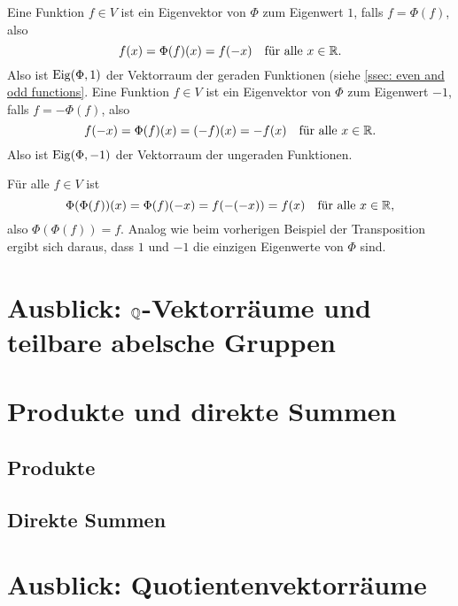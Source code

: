 \begin{bsp}
\begin{enumerate}
   Eine Funktion $f \in V$ ist ein Eigenvektor von $\Phi$ zum Eigenwert $1$, falls $f = \Phi(f)$, also
   \[
    f(x) = \Phi(f)(x) = f(-x)
    \quad
    \text{für alle $x \in \mathbb{R}$}.
   \]
   Also ist $\mathrm{Eig}(\Phi, 1)$ der Vektorraum der geraden Funktionen (siehe \ref{ssec: even and odd functions}. Eine Funktion $f \in V$ ist ein Eigenvektor von $\Phi$ zum Eigenwert $-1$, falls $f = -\Phi(f)$, also
   \[
    f(-x) = \Phi(f)(x) = (-f)(x) = -f(x)
    \quad
    \text{für alle $x \in \mathbb{R}$}.
   \]
   Also ist $\mathrm{Eig}(\Phi, -1)$ der Vektorraum der ungeraden Funktionen.
   
   Für alle $f \in V$ ist
   \[
    \Phi(\Phi(f))(x)
    = \Phi(f)(-x)
    = f(-(-x))
    = f(x)
    \quad
    \text{für alle $x \in \mathbb{R}$},
   \]
   also $\Phi(\Phi(f)) = f$. Analog wie beim vorherigen Beispiel der Transposition ergibt sich daraus, dass $1$ und $-1$ die einzigen Eigenwerte von $\Phi$ sind.
 \end{enumerate}
\end{bsp}






\section{Ausblick: \texorpdfstring{$\mathbb{Q}$}{Q}-Vektorräume und teilbare abelsche Gruppen}



\section{Produkte und direkte Summen}


\subsection{Produkte}


\subsection{Direkte Summen}



\section{Ausblick: Quotientenvektorräume}





